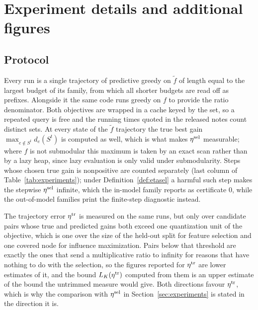 
\section{Experiment details and additional figures}\label{app:experiments}

\subsection{Protocol}\label{app:exp-protocol}

Every run is a single trajectory of predictive greedy on $\tilde f$ of length
equal to the largest budget of its family, from which all shorter budgets are
read off as prefixes.  Alongside it the same code runs greedy on $f$ to
provide the ratio denominator.  Both objectives are wrapped in a cache keyed
by the set, so a repeated query is free and the running times quoted in the
released notes count distinct sets.  At every state of the $\tilde f$
trajectory the true best gain $\max_{e\notin S^{t}}d_e(S^{t})$ is computed as
well, which is what makes $\eta^{\mathrm{sel}}$ measurable; where $f$ is not submodular
this maximum is taken by an exact scan rather than by a lazy heap, since
lazy evaluation is only valid under submodularity.  Steps whose chosen true
gain is nonpositive are counted separately (last column of
Table~\ref{tab:experiments}); under Definition~\ref{def:etasel} a harmful
such step makes the stepwise $\eta^{\mathrm{sel}}$ infinite, which the in-model family
reports as certificate $0$, while the out-of-model families print the
finite-step diagnostic instead.

The trajectory error $\eta^{\mathrm{tr}}$ is measured on the same runs, but only over
candidate pairs whose true and predicted gains both exceed one quantization
unit of the objective, which is one over the size of the held-out split for
feature selection and one covered node for influence maximization.  Pairs
below that threshold are exactly the ones that send a multiplicative ratio to
infinity for reasons that have nothing to do with the selection, so the
figures reported for $\eta^{\mathrm{tr}}$ are lower estimates of it, and the bound
$L_K(\eta^{\mathrm{tr}})$ computed from them is an upper estimate of the bound the
untrimmed measure would give.  Both directions favour $\eta^{\mathrm{tr}}$, which is why
the comparison with $\eta^{\mathrm{sel}}$ in Section~\ref{sec:experiments} is stated in
the direction it is.

